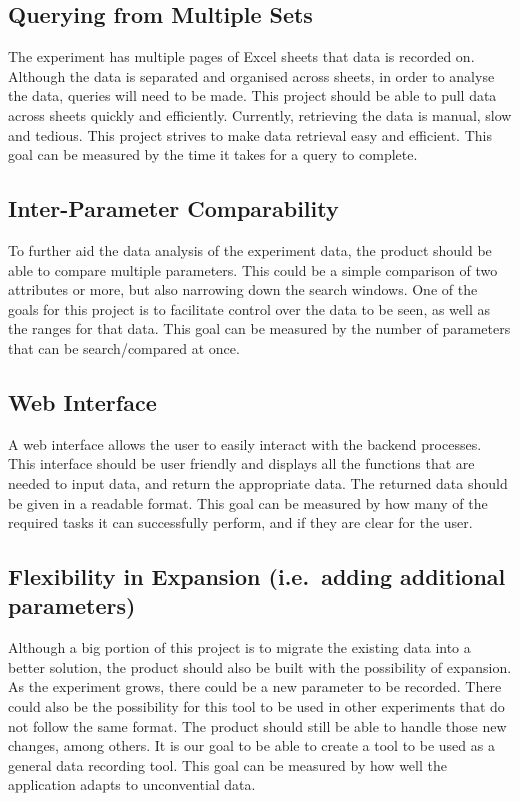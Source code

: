 \documentclass{article}
\begin{document}
\subsection{Querying from Multiple Sets}
The experiment has multiple pages of Excel sheets that data is recorded on.
Although the data is separated and organised across sheets, in order to analyse
the data, queries will need to be made. This project should be able to pull data
across sheets quickly and efficiently. Currently, retrieving the data is manual,
slow and tedious. This project strives to make data retrieval easy and
efficient. This goal can be measured by the time it takes for a query to
complete.  

\subsection{Inter-Parameter Comparability}
To further aid the data analysis of the experiment data, the product should be
able to compare multiple parameters. This could be a simple comparison of two
attributes or more, but also narrowing down the search windows.  One of the
goals for this project is to facilitate control over the data to be seen, as
well as the ranges for that data. This goal can be measured by the number of
parameters that can be search/compared at once.

\subsection{Web Interface}
A web interface allows the user to easily interact with the backend processes.
This interface should be user friendly and displays all the functions that are
needed to input data, and return the appropriate data. The returned data should
be given in a readable format. This goal can be measured by how many of the
required tasks it can successfully perform, and if they are clear for the user.

\subsection{Flexibility in Expansion (i.e.\ adding additional parameters)}
Although a big portion of this project is to migrate the existing data into a
better solution, the product should also be built with the possibility of
expansion. As the experiment grows, there could be a new parameter to be
recorded. There could also be the possibility for this tool to be used in other
experiments that do not follow the same format. The product should still be able
to handle those new changes, among others. It is our goal to be able to create a
tool to be used as a general data recording tool. This goal can be measured by
how well the application adapts to unconvential data.
\end{document}
